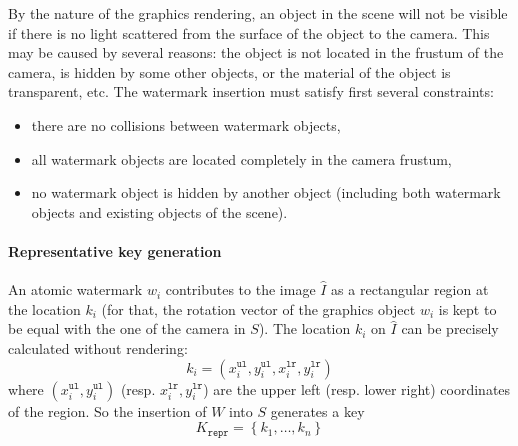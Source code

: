 \documentclass[a4paper,11pt,onecolumn]{memoir}
\begin{document}
By the nature of the graphics rendering, an object in the scene will not be visible if there is no light scattered from the surface of the object to the camera. This may be caused by several reasons: the object is not located in the frustum of the camera, is hidden by some other objects, or the material of the object is transparent, etc. The watermark insertion must satisfy first several constraints:
\begin{itemize}
    \item there are no collisions between watermark objects,
    \item all watermark objects are located completely in the camera frustum,
    \item no watermark object is hidden by another object (including both watermark objects and existing objects of the scene).
\end{itemize}

\paragraph[Representative key generation]{Representative key generation}
An atomic watermark $w_i$ contributes to the image $\hat{I}$ as a rectangular region at the location $k_i$ (for that, the rotation vector of the graphics object $w_i$ is kept to be equal with the one of the camera in $S$). The location $k_i$ on $\hat{I}$ can be precisely calculated without rendering:
\begin{equation*}
    k_i = \left(x^{\mathtt{ul}}_i, y^{\mathtt{ul}}_{i},x^{\mathtt{lr}}_i, y^{\mathtt{lr}}_{i}\right)
\end{equation*}
where $\left(x^{\mathtt{ul}}_i, y^{\mathtt{ul}}_{i}\right)$ (resp. $x^{\mathtt{lr}}_i, y^{\mathtt{lr}}_{i}$) are the upper left (resp. lower right) coordinates of the region. So the insertion of $W$ into $S$ generates a key
\begin{equation*}
    K_{\mathtt{repr}} = \left\{k_1,\dots,k_n \right\}
\end{equation*}
\end{document}
